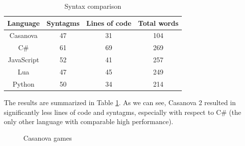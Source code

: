 \begin{table}[!t]
\caption{Syntax comparison}
\label{Syntax languages comparison}
\centering
\begin{tabular}{|c||c||c||c|}
\hline
Language & Syntagms & Lines of code & Total words\\
\hline
Casanova & 47 & 31 & 104\\
\hline
C\# & 61 & 69 & 269\\
\hline
JavaScript & 52 & 41 & 257\\
\hline
Lua & 47 & 45 & 249\\
\hline
Python & 50 & 34 & 214\\
\hline
\end{tabular}
\end{table}
The results are summarized in Table \ref{Syntax languages comparison}. As we can see, Casanova 2 resulted in significantly less lines of code and syntagms, especially with respect to C\# (the only other language with comparable high performance).


\begin{figure}[!t]
\centerline{
\hfil
{}}
\caption{Casanova games}
\label{casanova_games}
\end{figure}



